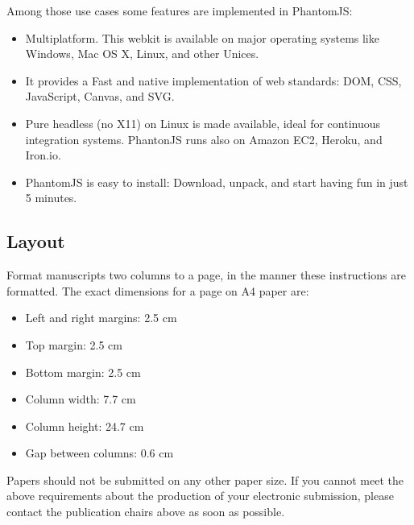 \documentclass[11pt]{article}
\begin{document}
Among those use cases some features are implemented in PhantomJS:

\begin{itemize}
\item Multiplatform. This webkit is available on major operating systems like Windows, Mac OS X, Linux, and other Unices.
\item It provides a Fast and native implementation of web standards: DOM, CSS, JavaScript, Canvas, and SVG.
\item Pure headless (no X11) on Linux is made available, ideal for continuous integration systems. PhantonJS runs also on Amazon EC2, Heroku, and Iron.io.
\item PhantomJS is easy to install: Download, unpack, and start having fun in just 5 minutes.
\end{itemize}

\subsection{Layout}
\label{ssec:layout}

Format manuscripts two columns to a page, in the manner these
instructions are formatted. The exact dimensions for a page on A4
paper are:

\begin{itemize}
\item Left and right margins: 2.5 cm
\item Top margin: 2.5 cm
\item Bottom margin: 2.5 cm
\item Column width: 7.7 cm
\item Column height: 24.7 cm
\item Gap between columns: 0.6 cm
\end{itemize}

\noindent Papers should not be submitted on any other paper size.
 If you cannot meet the above requirements about the production of your electronic submission, please contact the publication chairs above as soon as possible.


\end{document}
